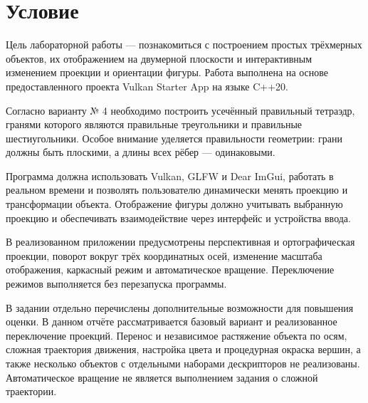 \section{Условие}

Цель лабораторной работы — познакомиться с построением простых трёхмерных объектов, их отображением на двумерной плоскости и интерактивным изменением проекции и ориентации фигуры. Работа выполнена на основе предоставленного проекта Vulkan Starter App на языке C++20.

Согласно варианту № 4 необходимо построить усечённый правильный тетраэдр, гранями которого являются правильные треугольники и правильные шестиугольники. Особое внимание уделяется правильности геометрии: грани должны быть плоскими, а длины всех рёбер — одинаковыми.

Программа должна использовать Vulkan, GLFW и Dear ImGui, работать в реальном времени и позволять пользователю динамически менять проекцию и трансформации объекта. Отображение фигуры должно учитывать выбранную проекцию и обеспечивать взаимодействие через интерфейс и устройства ввода.

В реализованном приложении предусмотрены перспективная и ортографическая проекции, поворот вокруг трёх координатных осей, изменение масштаба отображения, каркасный режим и автоматическое вращение. Переключение режимов выполняется без перезапуска программы.

В задании отдельно перечислены дополнительные возможности для повышения оценки. В данном отчёте рассматривается базовый вариант и реализованное переключение проекций. Перенос и независимое растяжение объекта по осям, сложная траектория движения, настройка цвета и процедурная окраска вершин, а также несколько объектов с отдельными наборами дескрипторов не реализованы. Автоматическое вращение не является выполнением задания о сложной траектории.
